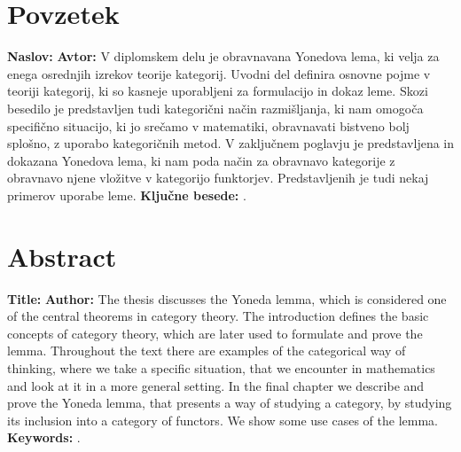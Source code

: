 \chapter*{Povzetek}
%
\noindent\textbf{Naslov:} \ttitle
\bigskip
%
\noindent\textbf{Avtor:} \tauthor
\bigskip
%
\noindent
V diplomskem delu je obravnavana Yonedova lema, ki velja za enega osrednjih izrekov teorije kategorij. Uvodni del definira osnovne pojme v teoriji kategorij, ki so kasneje uporabljeni za formulacijo in dokaz leme. Skozi besedilo je predstavljen tudi kategorični način razmišljanja, ki nam omogoča specifično situacijo, ki jo srečamo v matematiki, obravnavati bistveno bolj splošno, z uporabo kategoričnih metod.
V zaključnem poglavju je predstavljena in dokazana Yonedova lema, ki nam poda način za obravnavo kategorije z obravnavo njene vložitve v kategorijo funktorjev. Predstavljenih je tudi nekaj primerov uporabe leme.
\bigskip
%
\noindent\textbf{Ključne besede:} \tkeywords.
\clearemptydoublepage
%
\chapter*{Abstract}
%
\noindent\textbf{Title:} \ttitleEn
\bigskip
%
\noindent\textbf{Author:} \tauthor
\bigskip
%
\noindent 
The thesis discusses the Yoneda lemma, which is considered one of the central theorems in category theory. The introduction defines the basic concepts of category theory, which are later used to formulate and prove the lemma. Throughout the text there are examples of the categorical way of thinking, where we take a specific situation, that we encounter in mathematics and look at it in a more general setting. In the final chapter we describe and prove the Yoneda lemma, that presents a way of studying a category, by studying its inclusion into a category of functors. We show some use cases of the lemma.
%
\bigskip
%
\noindent\textbf{Keywords:} \tkeywordsEn.
\clearemptydoublepage